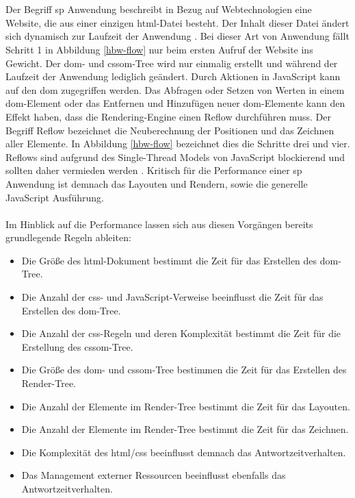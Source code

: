 \\\\
Der Begriff \gls{sp} Anwendung beschreibt in Bezug auf Webtechnologien eine Website, die aus einer einzigen \gls{html}-Datei besteht. Der Inhalt dieser Datei ändert sich dynamisch zur Laufzeit der Anwendung \cite{jp-spm}. Bei dieser Art von Anwendung fällt Schritt 1 in Abbildung \ref{hbw-flow} nur beim ersten Aufruf der Website ins Gewicht. Der \gls{dom}- und \gls{cssom}-Tree wird nur einmalig erstellt und während der Laufzeit der Anwendung lediglich geändert. Durch Aktionen in JavaScript kann auf den \gls{dom} zugegriffen werden. Das Abfragen oder Setzen von Werten in einem \gls{dom}-Element oder das Entfernen und Hinzufügen neuer \gls{dom}-Elemente kann den Effekt haben, dass die Rendering-Engine einen \gls{Reflow} durchführen muss. Der Begriff \gls{Reflow} bezeichnet die Neuberechnung der Positionen und das Zeichnen aller Elemente. In Abbildung \ref{hbw-flow} bezeichnet dies die Schritte drei und vier. \glspl{Reflow} sind aufgrund des Single-Thread Models von JavaScript blockierend und sollten daher vermieden werden \cite{dg-reflow}. Kritisch für die Performance einer \gls{sp} Anwendung ist demnach das Layouten und Rendern, sowie die generelle JavaScript Ausführung. 
\\\\
Im Hinblick auf die Performance lassen sich aus diesen Vorgängen bereits grundlegende Regeln ableiten: 
\begin{itemize}
	\item Die Größe des \gls{html}-Dokument bestimmt die Zeit für das Erstellen des \gls{dom}-Tree.
	\item Die Anzahl der \gls{css}- und JavaScript-Verweise beeinflusst die Zeit für das Erstellen des \gls{dom}-Tree.
	\item Die Anzahl der \gls{css}-Regeln und deren Komplexität bestimmt die Zeit für die Erstellung des \gls{cssom}-Tree. 
	\item Die Größe des \gls{dom}- und \gls{cssom}-Tree bestimmen die Zeit für das Erstellen des Render-Tree.
	\item Die Anzahl der Elemente im Render-Tree bestimmt die Zeit für das Layouten.
	\item Die Anzahl der Elemente im Render-Tree bestimmt die Zeit für das Zeichnen.
	\item Die Komplexität des \gls{html}/\gls{css} beeinflusst demnach das Antwortzeitverhalten.
	\item Das Management externer Ressourcen beeinflusst ebenfalls das Antwortzeitverhalten.
\end{itemize}

